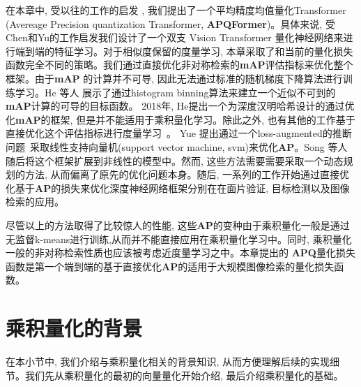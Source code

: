 在本章中, 受以往的工作的启发 \cite{chen2021crossvit,cakir2019deep,revaud2019learning}, 我们提出了一个平均精度均值量化Transformer (Avereage Precision quantization Transformer, \textbf{APQFormer})。具体来说, 受Chen和Yu的工作启发\cite{chen2021crossvit,yu2018product}我们设计了一个双支 Vision Transformer 量化神经网络来进行端到端的特征学习。对于相似度保留的度量学习, 本章采取了和当前的量化损失函数完全不同的策略。我们通过直接优化非对称检索的\textbf{mAP}评估指标来优化整个框架。由于\textbf{mAP} 的计算并不可导, 因此无法通过标准的随机梯度下降算法进行训练学习。He 等人\cite{he2018hashing,he2018local} 展示了通过histogram binning算法\cite{ustinova2016learning}来建立一个近似不可到的\textbf{mAP}计算的可导的目标函数。 2018年, He\cite{he2018hashing}提出一个为深度汉明哈希设计的通过优化\textbf{mAP}的框架, 但是并不能适用于乘积量化学习。除此之外, 也有其他的工作基于直接优化这个评估指标进行度量学习~\cite{yue2007support,mcallester2010direct,oh2016deep,henderson2016end}。 Yue 提出通过一个loss-augmented的推断问题~\cite{mcallester2010direct}采取线性支持向量机(support vector machine, svm)来优化\textbf{AP}。Song 等人\cite{song2016training} 随后将这个框架扩展到非线性的模型中。然而, 这些方法需要需要采取一个动态规划的方法, 从而偏离了原先的优化问题本身。随后, 一系列的工作开始\cite{he2018local,henderson2016end,revaud2019learning}通过直接优化基于\textbf{AP}的损失来优化深度神经网络框架分别在在面片验证, 目标检测以及图像检索的应用。\par
尽管以上的方法取得了比较惊人的性能, 这些\textbf{AP}的变种由于乘积量化一般是通过无监督k-means进行训练,从而并不能直接应用在乘积量化学习中。同时, 乘积量化一般的非对称检索性质也应该被考虑近度量学习之中。本章提出的 \textbf{APQ}量化损失函数是第一个端到端的基于直接优化\textbf{AP}的适用于大规模图像检索的量化损失函数。 
\section{乘积量化的背景}
在本小节中, 我们介绍与乘积量化相关的背景知识, 从而方便理解后续的实现细节。我们先从乘积量化的最初的向量量化开始介绍, 最后介绍乘积量化的基础。
